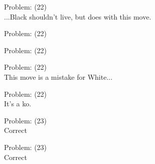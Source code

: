 \documentclass[11pt]{article}
\begin{document}
\begin{minipage}[t]{0.5\textwidth}
  {\centering
  
  Problem: (22)\\
  ...Black shouldn't live, but does with this move.\\
  }
\end{minipage}
\begin{minipage}[t]{0.5\textwidth}
  {\centering
  
  Problem: (22)\\
  
  }
\end{minipage}
\begin{minipage}[t]{0.5\textwidth}
  {\centering
  
  Problem: (22)\\
  
  }
\end{minipage}
\begin{minipage}[t]{0.5\textwidth}
  {\centering
  
  Problem: (22)\\
  This move is a mistake for White...\\
  }
\end{minipage}
\begin{minipage}[t]{0.5\textwidth}
  {\centering
  
  Problem: (22)\\
  It's a ko.\\
  }
\end{minipage}
\begin{minipage}[t]{0.5\textwidth}
  {\centering
  
  Problem: (23)\\
  Correct\\
  }
\end{minipage}
\begin{minipage}[t]{0.5\textwidth}
  {\centering
  
  Problem: (23)\\
  Correct\\
  }
\end{minipage}
\end{document}
